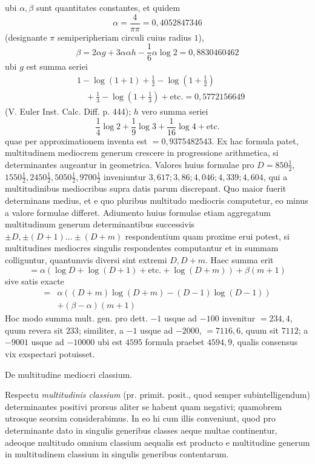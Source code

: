 ubi \(\alpha,\beta\) sunt quantitates constantes, et quidem 
\[\alpha=\frac{4}{\pi\pi}=0{,}4052847346\]
 (designante \(\pi\) semiperipheriam circuli cuius radius \(1\)), 
\[\beta=2\alpha g+3\alpha\alpha h-\frac16\alpha\log2=0{,}8830460462\]
 ubi \(g\) est summa seriei 
\[\begin{aligned}&1-\log(1+1)+\frac12-\log(1+\frac12)\\&\quad+\frac13-\log(1+\frac13)+\text{etc.}=0{,}5772156649\end{aligned}\]
 (V. Euler Inst. Calc. Diff. p. 444); \(h\) vero summa seriei 
\[\frac14\log2+\frac19\log3+\frac1{16}\log4+\text{etc.}\]
 quae per approximationem inventa est \(=0{,}9375482543\). Ex hac formula patet, multitudinem mediocrem generum crescere in progressione arithmetica, si determinantes augeantur in geometrica. Valores huius formulae pro \(D=850\frac12\), \(1550\frac12,2450\frac12,5050\frac12,9700\frac12\) inveniuntur \(3{,}617;3{,}86;4{,}046;4{,}339;4{,}604\), qui a multitudinibus mediocribus supra datis parum discrepant. Quo maior fuerit determinans medius, et e quo pluribus multitudo mediocris computetur, eo minus a valore formulae differet. Adiumento huius formulae etiam aggregatum multitudinum generum determinantibus successivis \(\pm D,\pm(D+1)\ldots\pm(D+m)\) respondentium quam proxime erui potest, si multitudines mediocres singulis respondentes computantur et in summam colliguntur, quantumvis diversi sint extremi \(D,D+m\). Haec summa erit 
\[=\alpha(\log D+\log(D+1)+\text{etc.}+\log(D+m))+\beta(m+1)\]
 sive satis exacte 
\[\begin{aligned}={}&\alpha((D+m)\log(D+m)-(D-1)\log(D-1))\\&+(\beta-\alpha)(m+1)\end{aligned}\]
 Hoc modo summa mult. gen. pro dett. \(-1\) usque ad \(-100\) invenitur \(=234{,}4\), quum revera sit \(233\); similiter, a \(-1\) usque ad \(-2000\), \(=7116{,}6\), quum sit \(7112\); a \(-9001\) usque ad \(-10000\) ubi est \(4595\) formula praebet \(4594{,}9\), qualis consensus vix exspectari potuisset.

\begin{center}De multitudine mediocri classium.\end{center}


Respectu \textit{multitudinis classium} (pr. primit. posit., quod semper subintelligendum) determinantes positivi prorsus aliter se habent quam negativi; quamobrem utrosque seorsim considerabimus. In eo hi cum illis conveniunt, quod pro determinante dato in singulis generibus classes aeque multae continentur, adeoque multitudo omnium classium aequalis est producto e multitudine generum in multitudinem classium in singulis generibus contentarum.


